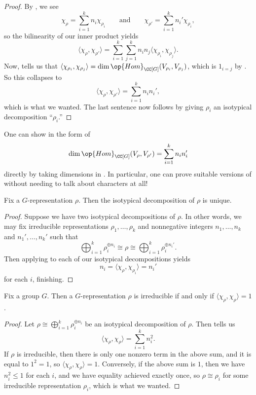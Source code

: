 \documentclass[../main.tex]{subfiles}
\begin{document}
\begin{proof}
	By , we see
	\[\chi_\rho=\sum_{i=1}^kn_i\chi_{\rho_i}\qquad\text{and}\qquad\chi_{\rho'}=\sum_{i=1}^kn_i'\chi_{\rho_i},\]
	so the bilinearity of our inner product yields
	\[\langle\chi_\rho,\chi_{\rho'}\rangle=\sum_{i=1}^k\sum_{j=1}^kn_in_j\langle\chi_{\rho_i},\chi_{\rho_j}\rangle.\]
	Now,  tells us that $\langle\chi_{\rho_i},\chi_{\rho_j}\rangle=\dim\op{Hom}_{\CC[G]}(V_{\rho_i},V_{\rho_j})$, which is $1_{i=j}$ by . So this collapses to
	\[\langle\chi_\rho,\chi_{\rho'}\rangle=\sum_{i=1}^kn_in_i',\]
	which is what we wanted. The last sentence now follows by giving $\rho_i$ an isotypical decomposition ``$\rho_i$.''
\end{proof}
\begin{remark}
	One can show  in the form of
	\[\dim\op{Hom}_{\CC[G]}(V_\rho,V_{\rho'})=\sum_{i=1}^kn_in_i'\]
	directly by taking dimensions in . In particular, one can prove suitable versions of  without needing to talk about characters at all!
\end{remark}
\begin{corollary} \label{cor:isotypical-unique}
	Fix a $G$-representation $\rho$. Then the isotypical decomposition of $\rho$ is unique.
\end{corollary}
\begin{proof}
	Suppose we have two isotypical decompositions of $\rho$. In other words, we may fix irreducible representations $\rho_1,\ldots,\rho_k$ and nonnegative integers $n_1,\ldots,n_k$ and $n_1',\ldots,n_k'$ such that
	\[\bigoplus_{i=1}^k\rho_i^{\oplus n_i}\cong\rho\cong\bigoplus_{i=1}^k\rho_i^{\oplus n_i'}.\]
	Then applying  to each of our isotypical decompositions yields
	\[n_i=\langle\chi_\rho,\chi_{\rho_i}\rangle=n_i'\]
	for each $i$, finishing.
\end{proof}
\begin{corollary} \label{cor:irrep-iff-norm-1}
	Fix a group $G$. Then a $G$-representation $\rho$ is irreducible if and only if $\langle\chi_\rho,\chi_\rho\rangle=1$.
\end{corollary}
\begin{proof}
	Let $\rho\cong\bigoplus_{i=1}^k\rho_i^{\oplus n_i}$ be an isotypical decomposition of $\rho$. Then  tells us
	\[\langle\chi_\rho,\chi_\rho\rangle=\sum_{i=1}^kn_i^2.\]
	If $\rho$ is irreducible, then there is only one nonzero term in the above sum, and it is equal to $1^2=1$, so $\langle\chi_\rho,\chi_\rho\rangle=1$. Conversely, if the above sum is $1$, then we have $n_i^2\le1$ for each $i$, and we have equality achieved exactly once, so $\rho\cong\rho_i$ for some irreducible representation $\rho_i$, which is what we wanted.
\end{proof}
\end{document}
